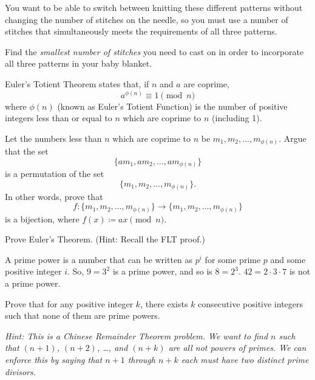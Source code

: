 \documentclass[11pt]{article}
\begin{document}
You want to be able to switch between knitting these different
patterns without changing the number of stitches on the needle, so you
must use a number of stitches that simultaneously meets the requirements of all three
patterns.

Find the \emph{smallest number of stitches} you need to cast on in
order to incorporate all three patterns in your baby blanket.


Euler's Totient Theorem states that, if $n$ and $a$ are coprime,
\[
  a^{\phi(n)} \equiv 1 \pmod{n}
\]
where $\phi(n)$ (known as Euler's Totient Function) is the number of positive
integers less than or equal to $n$ which are coprime to $n$ (including 1).

\begin{Parts}
  \Part Let the numbers less than $n$ which are coprime to $n$ be $m_1, m_2, \ldots, m_{\phi(n)}$. 
  Argue that the set
  \[\{am_1, am_2, \ldots, am_{\phi(n)}\}\]
  is a permutation of the set
  \[\{m_1, m_2, \ldots, m_{\phi(n)}\}.\]
  In other words, prove that 
  \[f:\{m_1, m_2, \ldots, m_{\phi(n)}\} \to \{m_1, m_2, \ldots, m_{\phi(n)}\}\]
  is a bijection, where $f(x) \coloneqq ax \pmod{n}$.

  \Part Prove Euler's Theorem. (Hint: Recall the FLT proof.)
\end{Parts}


A prime power is a number that can be written as $p^i$ for some prime $p$ and some
positive integer $i$. So, $9 = 3^2$ is a prime power, and so is $8 = 2^3$. $42 = 2 \cdot 3 \cdot 7$ is not
a prime power.

Prove that for any positive integer $k$, there exists $k$ consecutive positive integers
such that none of them are prime powers.

\emph{Hint: This is a Chinese Remainder Theorem problem. We want to find $n$ such that $(n + 1)$, $(n + 2)$, \ldots, and $(n + k)$ are all not powers of primes. We can enforce this by saying that $n + 1$ through $n + k$ each must have two distinct prime divisors.}
\end{document}
